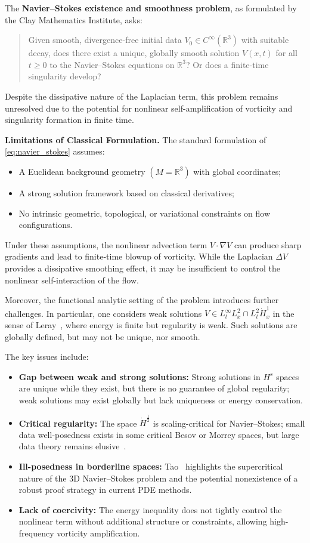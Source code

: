 The \textbf{Navier--Stokes existence and smoothness problem}, as formulated by the Clay Mathematics Institute, asks:

\begin{quote}
Given smooth, divergence-free initial data $V_0 \in C^\infty(\mathbb{R}^3)$ with suitable decay, does there exist a unique, globally smooth solution $V(x,t)$ for all $t \geq 0$ to the Navier–Stokes equations on $\mathbb{R}^3$? Or does a finite-time singularity develop?
\end{quote}

Despite the dissipative nature of the Laplacian term, this problem remains unresolved due to the potential for nonlinear self-amplification of vorticity and singularity formation in finite time.

\textbf{Limitations of Classical Formulation.} The standard formulation of \eqref{eq:navier_stokes} assumes:
\begin{itemize}
  \item A Euclidean background geometry $(M = \mathbb{R}^3)$ with global coordinates;
  \item A strong solution framework based on classical derivatives;
  \item No intrinsic geometric, topological, or variational constraints on flow configurations.
\end{itemize}
Under these assumptions, the nonlinear advection term $V \cdot \nabla V$ can produce sharp gradients and lead to finite-time blowup of vorticity. While the Laplacian $\Delta V$ provides a dissipative smoothing effect, it may be insufficient to control the nonlinear self-interaction of the flow.

Moreover, the functional analytic setting of the problem introduces further challenges. In particular, one considers weak solutions $V \in L^\infty_t L^2_x \cap L^2_t \dot{H}^1_x$ in the sense of Leray~\cite{leray1934mouvement}, where energy is finite but regularity is weak. Such solutions are globally defined, but may not be unique, nor smooth.

The key issues include:
\begin{itemize}
  \item \textbf{Gap between weak and strong solutions:} Strong solutions in $H^s$ spaces are unique while they exist, but there is no guarantee of global regularity; weak solutions may exist globally but lack uniqueness or energy conservation.
  \item \textbf{Critical regularity:} The space $\dot{H}^{\frac{1}{2}}$ is scaling-critical for Navier–Stokes; small data well-posedness exists in some critical Besov or Morrey spaces, but large data theory remains elusive~\cite{koch2001liouville}.
  \item \textbf{Ill-posedness in borderline spaces:} Tao~\cite{tao2014ns} highlights the supercritical nature of the 3D Navier–Stokes problem and the potential nonexistence of a robust proof strategy in current PDE methods.
  \item \textbf{Lack of coercivity:} The energy inequality does not tightly control the nonlinear term without additional structure or constraints, allowing high-frequency vorticity amplification.
\end{itemize}

